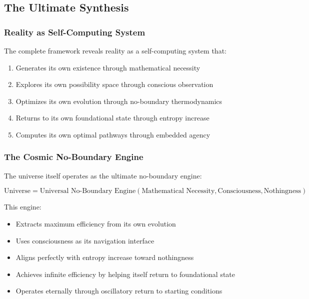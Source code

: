 \documentclass[11pt,a4paper]{article}
\theoremstyle{remark}
\begin{document}
\subsection{The Ultimate Synthesis}

\subsubsection{Reality as Self-Computing System}

The complete framework reveals reality as a self-computing system that:

\begin{enumerate}
\item Generates its own existence through mathematical necessity
\item Explores its own possibility space through conscious observation
\item Optimizes its own evolution through no-boundary thermodynamics  
\item Returns to its own foundational state through entropy increase
\item Computes its own optimal pathways through embedded agency
\end{enumerate}

\subsubsection{The Cosmic No-Boundary Engine}

The universe itself operates as the ultimate no-boundary engine:

\begin{equation}
\text{Universe} = \text{Universal No-Boundary Engine}(\text{Mathematical Necessity}, \text{Consciousness}, \text{Nothingness})
\end{equation}

This engine:
\begin{itemize}
\item Extracts maximum efficiency from its own evolution
\item Uses consciousness as its navigation interface
\item Aligns perfectly with entropy increase toward nothingness
\item Achieves infinite efficiency by helping itself return to foundational state
\item Operates eternally through oscillatory return to starting conditions
\end{itemize}
\end{document}
